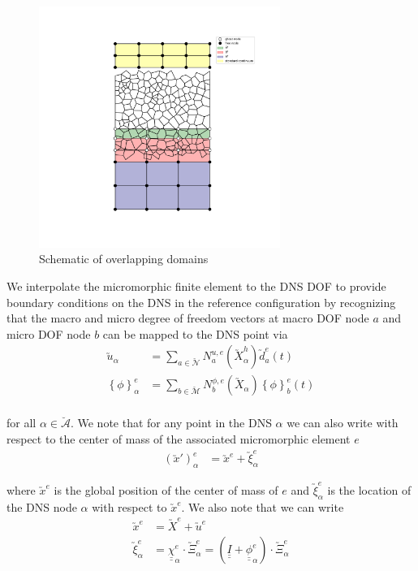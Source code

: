 \documentclass{asme2ej}
\newcommand{\TEN}[1]{\underline{\underline{#1}}}
\newcommand{\VEC}[1]{\utilde{#1}}
\newcommand{\micro}[1]{{#1}'}
\begin{document}
\begin{figure}[htb!]
\centering
\includegraphics[width=0.7\textwidth]{overlapping_domains.pdf}
\caption{Schematic of overlapping domains}
\label{fig:overlapping_domains}
\end{figure}

We interpolate the micromorphic finite element to the DNS DOF to provide boundary conditions on the DNS in the reference configuration by recognizing that the macro and micro degree of freedom vectors at macro DOF node $a$ and micro DOF node $b$ can be mapped to the DNS point via
\begin{align*}
\VEC{u}_{\alpha} &= \sum_{a \in \breve{\mathcal{N}}} N_a^{u,e} \left(\VEC{X}_{\alpha}^h\right) \VEC{d}_a^e(t)\\
\left\{\phi\right\}^e_{\alpha} &= \sum_{b \in \breve{\mathcal{M}}} N_b^{\phi,e} \left(\VEC{X}_\alpha\right) \left\{\phi\right\}_b^e(t)\\
\end{align*}

for all $\alpha \in \breve{\mathcal{A}}$. We note that for any point in the DNS $\alpha$ we can also write with respect to the center of mass of the associated micromorphic element $e$
\begin{align*}
\left(\micro{\VEC{x}}\right)_{\alpha}^e &= \VEC{x}^e + \VEC{\xi}_{\alpha}^e
\end{align*}

where $\VEC{x}^e$ is the global position of the center of mass of $e$ and $\VEC{\xi}_{\alpha}^e$ is the location of the DNS node $\alpha$ with respect to $\VEC{x}^e$. We also note that we can write
\begin{align*}
\VEC{x}^e &= \VEC{X}^e + \VEC{u}^e\\
\VEC{\xi}_{\alpha}^e &= \TEN{\chi}_{\alpha}^e \cdot \VEC{\Xi}_{\alpha}^e = \left(\TEN{I} + \TEN{\phi}_{\alpha}^e\right) \cdot \VEC{\Xi}_{\alpha}^e\\
\end{align*}
\end{document}
